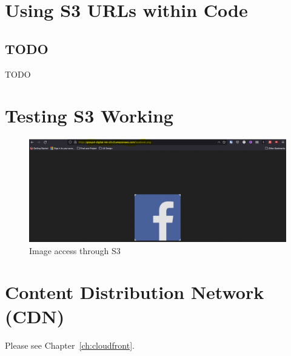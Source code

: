 \section{Using S3 URLs within Code}

\subsection{TODO}

TODO

\section{Testing S3 Working}

\begin{figure}
    \centering
    \includegraphics[width=\textwidth]{resources/s3/s3-image-displayed}
    \caption{Image access through S3}
    \label{fig:s3-image}
\end{figure}


\section{Content Distribution Network (CDN)}
Please see Chapter~\ref{ch:cloudfront}.

